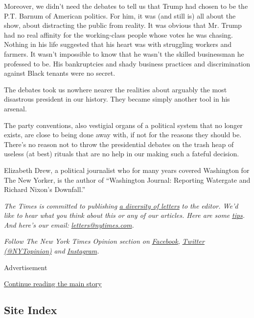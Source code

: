 Moreover, we didn't need the debates to tell us that Trump had chosen to
be the P.T. Barnum of American politics. For him, it was (and still is)
all about the show, about distracting the public from reality. It was
obvious that Mr. Trump had no real affinity for the working-class people
whose votes he was chasing. Nothing in his life suggested that his heart
was with struggling workers and farmers. It wasn't impossible to know
that he wasn't the skilled businessman he professed to be. His
bankruptcies and shady business practices and discrimination against
Black tenants were no secret.

The debates took us nowhere nearer the realities about arguably the most
disastrous president in our history. They became simply another tool in
his arsenal.

The party conventions, also vestigial organs of a political system that
no longer exists, are close to being done away with, if not for the
reasons they should be. There's no reason not to throw the presidential
debates on the trash heap of useless (at best) rituals that are no help
in our making such a fateful decision.

Elizabeth Drew, a political journalist who for many years covered
Washington for The New Yorker, is the author of ``Washington Journal:
Reporting Watergate and Richard Nixon's Downfall.''

\emph{The Times is committed to publishing}
\href{https://www.nytimes.com/2019/01/31/opinion/letters/letters-to-editor-new-york-times-women.html}{\emph{a
diversity of letters}} \emph{to the editor. We'd like to hear what you
think about this or any of our articles. Here are some}
\href{https://help.nytimes.com/hc/en-us/articles/115014925288-How-to-submit-a-letter-to-the-editor}{\emph{tips}}\emph{.
And here's our email:}
\href{mailto:letters@nytimes.com}{\emph{letters@nytimes.com}}\emph{.}

\emph{Follow The New York Times Opinion section on}
\href{https://www.facebook.com/nytopinion}{\emph{Facebook}}\emph{,}
\href{http://twitter.com/NYTOpinion}{\emph{Twitter (@NYTopinion)}}
\emph{and}
\href{https://www.instagram.com/nytopinion/}{\emph{Instagram}}\emph{.}

Advertisement

\protect\hyperlink{after-bottom}{Continue reading the main story}

\hypertarget{site-index}{%
\subsection{Site Index}\label{site-index}}

